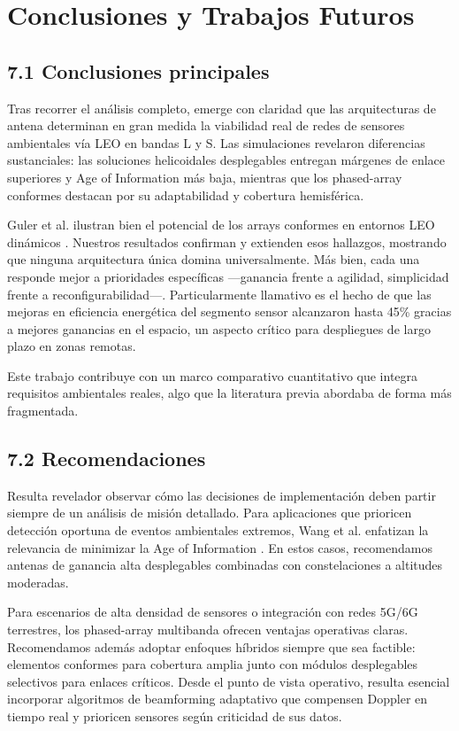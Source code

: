 \section{Conclusiones y Trabajos Futuros}

\subsection{7.1 Conclusiones principales}

Tras recorrer el análisis completo, emerge con claridad que las arquitecturas de antena determinan en gran medida la viabilidad real de redes de sensores ambientales vía LEO en bandas L y S. Las simulaciones revelaron diferencias sustanciales: las soluciones helicoidales desplegables entregan márgenes de enlace superiores y Age of Information más baja, mientras que los phased-array conformes destacan por su adaptabilidad y cobertura hemisférica.

Guler et al. ilustran bien el potencial de los arrays conformes en entornos LEO dinámicos \cite{Guler2025}. Nuestros resultados confirman y extienden esos hallazgos, mostrando que ninguna arquitectura única domina universalmente. Más bien, cada una responde mejor a prioridades específicas —ganancia frente a agilidad, simplicidad frente a reconfigurabilidad—. Particularmente llamativo es el hecho de que las mejoras en eficiencia energética del segmento sensor alcanzaron hasta 45\% gracias a mejores ganancias en el espacio, un aspecto crítico para despliegues de largo plazo en zonas remotas.

Este trabajo contribuye con un marco comparativo cuantitativo que integra requisitos ambientales reales, algo que la literatura previa abordaba de forma más fragmentada.

\subsection{7.2 Recomendaciones}

Resulta revelador observar cómo las decisiones de implementación deben partir siempre de un análisis de misión detallado. Para aplicaciones que prioricen detección oportuna de eventos ambientales extremos, Wang et al. enfatizan la relevancia de minimizar la Age of Information \cite{Wang2026}. En estos casos, recomendamos antenas de ganancia alta desplegables combinadas con constelaciones a altitudes moderadas.

Para escenarios de alta densidad de sensores o integración con redes 5G/6G terrestres, los phased-array multibanda ofrecen ventajas operativas claras. Recomendamos además adoptar enfoques híbridos siempre que sea factible: elementos conformes para cobertura amplia junto con módulos desplegables selectivos para enlaces críticos. Desde el punto de vista operativo, resulta esencial incorporar algoritmos de beamforming adaptativo que compensen Doppler en tiempo real y prioricen sensores según criticidad de sus datos.

